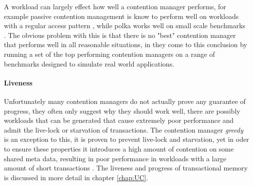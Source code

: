 A workload can largely effect how well a contention manager performs, for example passive contention
 management is know to perform well on workloads with a regular access pattern \cite{1504199}, while
 polka \cite{1073861} works well on small scale benchmarks \cite{DGK09}.
The obvious problem with this is that there is no "best" contention manager that performs well in 
all reasonable situations, in \cite{guerraoui05polymorphic/LPD} they come to this conclusion by 
running a set of the top performing contention managers on a range of benchmarks designed to simulate real world applications.

\paragraph{Liveness}
Unfortunately many contention managers do not actually prove any guarantee of progress, they often
 only suggest why they should work well, there are possibly workloads that can be generated that 
cause extremely poor performance and admit the live-lock or starvation of transactions.
The contention manager \emph{greedy} \cite{GHP05} is an exception to this,
it is proven to prevent live-lock and starvation, yet in oder to ensure these properties it
 introduces a high amount of contention on some shared meta data, resulting in poor performance in
 workloads with a large amount of short transactions \cite{DGK09}.
The liveness and progress of transactional memory is discussed in more detail in chapter
\ref{chap:UC}.





















